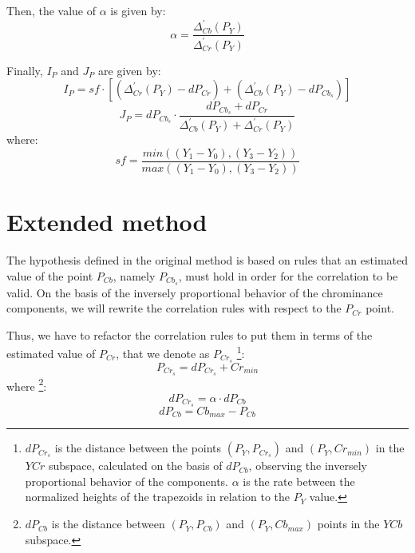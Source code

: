 Then, the value of $\alpha$ is given by:
\begin{equation}
    \alpha = \frac{\Delta^{'}_{Cb}(P_Y)} {\Delta^{'}_{Cr}(P_Y)}
\end{equation}

Finally, $I_P$ and $J_P$ are given by:
\begin{equation}
    I_P = sf \cdot [(\Delta^{'}_{Cr}(P_Y) - dP_{Cr}) + (\Delta^{'}_{Cb}(P_Y) - dP_{Cb_s})]
    \label{eq:ip}
\end{equation}
\begin{equation}
    J_P = dP_{Cb_s} \cdot \frac{dP_{Cb_s} + dP_{Cr}} {\Delta^{'}_{Cb}(P_Y) + \Delta^{'}_{Cr}(P_Y)}
    \label{eq:jp}
\end{equation}
where:
\begin{equation}
    sf = \frac{min( (Y_1 - Y_0), (Y_3 - Y_2) )} {max( (Y_1 - Y_0), (Y_3 - Y_2) )}
\end{equation}


\section{Extended method}
\label{sec:proposed_method}
The hypothesis defined in the original method is based on rules that an estimated value of the point $P_{Cb}$, namely $P_{Cb_s}$, must hold in order for the correlation to be valid. On the basis of the inversely proportional behavior of the chrominance components, we will rewrite the correlation rules with respect to the $P_{Cr}$ point.

Thus, we have to refactor the correlation rules to put them in terms of the estimated value of $P_{Cr}$, that we denote as $P_{Cr_s}$ \footnote{$dP_{Cr_s}$ is the distance between the points $(P_Y, P_{Cr_s})$ and $(P_Y, Cr_{min})$ in the $YCr$ subspace, calculated on the basis of $dP_{Cb}$, observing the inversely proportional behavior of the components. $\alpha$ is the rate between the normalized heights of the trapezoids in relation to the $P_Y$ value.}:
\begin{equation}
    P_{Cr_s} = dP_{Cr_s} + Cr_{min}
\end{equation}
where \footnote{$dP_{Cb}$ is the distance between $(P_Y, P_{Cb})$ and $(P_Y, Cb_{max})$ points in the $YCb$ subspace.}:
\begin{equation}
    dP_{Cr_s} = \alpha \cdot dP_{Cb}
\end{equation}
\begin{equation}
    dP_{Cb}   = Cb_{max} - P_{Cb}
\end{equation}

